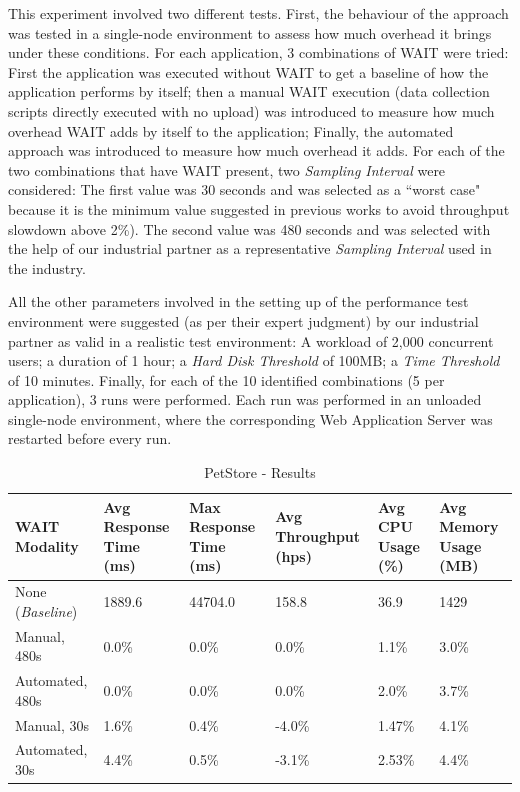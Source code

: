 \documentclass[runningheads,a4paper]{llncs}
\begin{document}
This experiment involved two different tests. First, the behaviour of
the approach was tested in a single-node environment to assess how much
overhead it brings under these conditions. For each application, 3 combinations
of WAIT were tried: First the application was executed without WAIT to get a
baseline of how the application performs by itself; then a manual WAIT execution (data collection
scripts directly executed with no upload) was introduced to measure how much
overhead WAIT adds by itself to the application; Finally, the automated approach was introduced to
measure how much overhead it adds. For each of the two combinations that have
WAIT present, two \emph{Sampling Interval} were considered: The first
value was 30 seconds and was selected as a ``worst case" because it is the
minimum value suggested in previous works \cite{Altman2010} to avoid throughput
slowdown above 2\%). The second value was 480 seconds and was selected with the
help of our industrial partner as a representative \emph{Sampling Interval} used in the industry.

All the other parameters involved in the setting up of the performance test
environment were suggested (as per their expert judgment) by our industrial
partner as valid in a realistic test environment: A workload of 2,000 concurrent users; a duration of
1 hour; a \emph{Hard Disk Threshold} of 100MB; a \emph{Time Threshold} of 10
minutes. Finally, for each of the 10 identified combinations (5 per
application), 3 runs were performed. Each run was performed in an unloaded
single-node environment, where the corresponding Web Application Server was restarted 
before every run.

\begin{table}[!h]
\caption{PetStore - Results}
\label{PetStore1}
\centering
\begin{tabular}{p{}|p{}|p{}|p{}|p{}|p{}}
\hline
\bfseries WAIT Modality & \bfseries Avg Response Time (ms)& \bfseries Max
Response Time (ms)& \bfseries Avg Throughput (hps)& \bfseries Avg CPU Usage
(\%) & \bfseries Avg Memory Usage (MB)\\
\hline
None (\emph{Baseline}) 	& 1889.6	& 44704.0	& 158.8 	& 36.9 		& 1429\\
Manual, 480s 			& 0.0\% 	& 0.0\%		& 0.0\%		& 1.1\% 	& 3.0\%\\
Automated, 480s 		& 0.0\%		& 0.0\%		& 0.0\% 	& 2.0\% 	& 3.7\%\\
Manual, 30s 			& 1.6\%		& 0.4\%		& -4.0\% 	& 1.47\% 	& 4.1\%\\
Automated, 30s 			& 4.4\%		& 0.5\%		& -3.1\% 	& 2.53\% 	& 4.4\%\\
\hline
\end{tabular}
\end{table}
\end{document}
